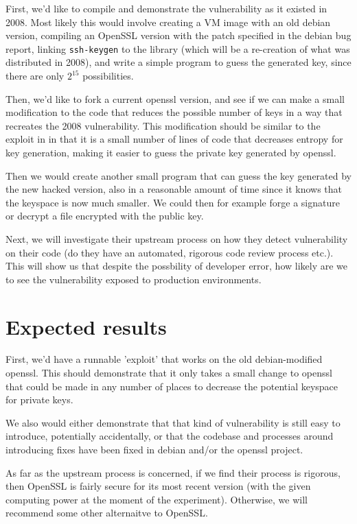 \documentclass[conference]{IEEEtran}
\begin{document}
First, we'd like to compile and demonstrate the vulnerability as it
existed in 2008. Most likely this would involve creating a VM image
with an old debian version, compiling an OpenSSL version with the
patch specified in the debian bug report\cite{3}, linking
\verb|ssh-keygen| to the library (which will be a re-creation of what
was distributed in 2008), and write a simple program to guess the
generated key, since there are only $2^{15}$ possibilities.

Then, we'd like to fork a current openssl version, and see if we can
make a small modification to the code that reduces the possible number
of keys in a way that recreates the 2008 vulnerability. This
modification should be similar to the exploit in \cite{1} in that it
is a small number of lines of code that decreases entropy for key
generation, making it easier to guess the private key generated by
openssl.

Then we would create another small program that can guess the key
generated by the new hacked version, also in a reasonable amount of
time since it knows that the keyspace is now much smaller. We could
then for example forge a signature or decrypt a file encrypted with
the public key.

Next, we will investigate their upstream process on how they
detect vulnerability on their code (do they have an automated,
rigorous code review process etc.). This will show us that despite
the possbility of developer error, how likely are we to see
the vulnerability exposed to production environments.

\section{Expected results}

First, we'd have a runnable 'exploit' that works on the old
debian-modified openssl. This should demonstrate that it only takes a
small change to openssl that could be made in any number of places to
decrease the potential keyspace for private keys.

We also would either demonstrate that that kind of vulnerability is
still easy to introduce, potentially accidentally, or that the
codebase and processes around introducing fixes have been fixed in
debian and/or the openssl project.

As far as the upstream process is concerned, if we find
their process is rigorous, then OpenSSL is fairly secure
for its most recent version (with the given computing power
at the moment of the experiment). Otherwise, we will recommend
some other alternaitve to OpenSSL.
\end{document}

